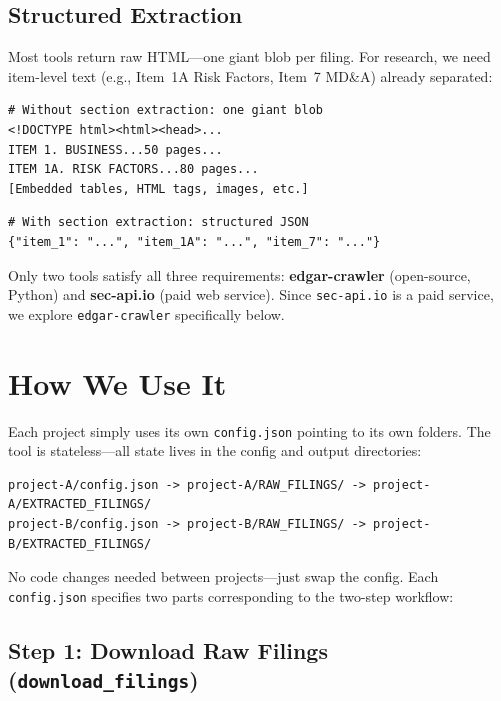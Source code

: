 \documentclass[11pt]{article}
\begin{document}
\subsection*{Structured Extraction}

Most tools return raw HTML---one giant blob per filing. For research, we need
item-level text (e.g., Item~1A Risk Factors, Item~7 MD\&A) already separated:

\begin{lstlisting}[language={}]
# Without section extraction: one giant blob
<!DOCTYPE html><html><head>...
ITEM 1. BUSINESS...50 pages...
ITEM 1A. RISK FACTORS...80 pages...
[Embedded tables, HTML tags, images, etc.]
\end{lstlisting}

\begin{lstlisting}[language={}]
# With section extraction: structured JSON
{"item_1": "...", "item_1A": "...", "item_7": "..."}
\end{lstlisting}

Only two tools satisfy all three requirements: \textbf{edgar-crawler}
(open-source, Python) and \textbf{sec-api.io} (paid web service). Since
\texttt{sec-api.io} is a paid service, we explore \texttt{edgar-crawler}
specifically below.

\section{How We Use It}

Each project simply uses its own \texttt{config.json} pointing to its own
folders. The tool is stateless---all state lives in the config and output
directories:

\begin{lstlisting}[language={}]
project-A/config.json -> project-A/RAW_FILINGS/ -> project-A/EXTRACTED_FILINGS/
project-B/config.json -> project-B/RAW_FILINGS/ -> project-B/EXTRACTED_FILINGS/
\end{lstlisting}

No code changes needed between projects---just swap the config. Each
\texttt{config.json} specifies two parts corresponding to the two-step
workflow:

\subsection*{Step 1: Download Raw Filings (\texttt{download\_filings})}
\end{document}
